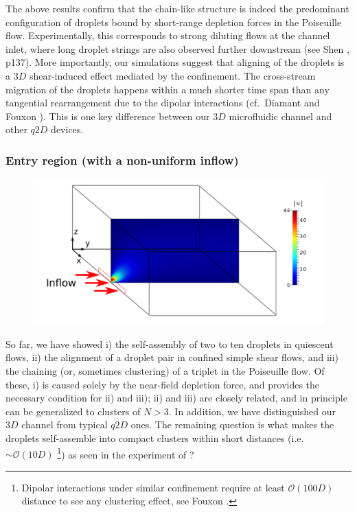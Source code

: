 The above results confirm that the chain-like structure is indeed the predominant configuration of droplets bound by short-range depletion forces in the Poiseuille flow. Experimentally, this corresponds to strong diluting flows at the channel inlet, where long droplet strings are also observed further downstream (see Shen \cite{shen_thesis}, p137). More importantly, our simulations suggest that aligning of the droplets is a $3D$ shear-induced effect mediated by the confinement. The cross-stream migration of the droplets happens within a much shorter time span than any tangential rearrangement due to the dipolar interactions (cf.\ Diamant \cite{Diamant} and Fouxon \etal \cite{Fouxon_2017}). This is one key difference between our $3D$ microfluidic channel and other $q2D$ devices. 


\subsubsection{Entry region (with a non-uniform inflow)} \label{sec:non-uniform}

\begin{figure}[t]
 \centering
 \includegraphics[width=.9\columnwidth]{figs/non-uniform_inflow1.pdf}
 \caption{}
 \label{fig: non-uniform sketch}
\end{figure}

So far, we have showed i) the self-assembly of two to ten droplets in quiescent flows, ii) the alignment of a droplet pair in confined simple shear flows, and iii) the chaining (or, sometimes clustering) of a triplet in the Poiseuille flow. Of these, i) is caused solely by the near-field depletion force, and provides the necessary condition for ii) and iii); ii) and iii) are closely related, and in principle can be generalized to clusters of $N>3$. In addition, we have distinguished our $3D$ channel from typical $q2D$ ones. The remaining question is what makes the droplets self-assemble into compact clusters within short distances (i.e.\ $\sim \mathcal{O}(10D)$ \footnote[4]{Dipolar interactions under similar confinement require at least $\mathcal{O}(100D)$ distance to see any clustering effect, see Fouxon \etal \cite{Fouxon_2017}.}) as seen in the experiment of   \cite{Shen_2016AS}?


